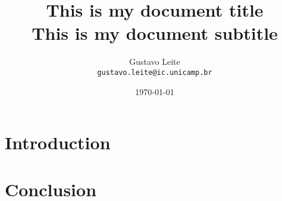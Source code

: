 \documentclass[12pt,a4paper]{article}
\title{This is my document title \\ \large This is my document subtitle}
\author{Gustavo Leite \\ \texttt{gustavo.leite@ic.unicamp.br}}
\date{\today}
\begin{document}
\maketitle

\begin{abstract}
  \lipsum[1]
\end{abstract}

\section{Introduction} \label{sec:intro}

\lipsum[4-6]

\section{Conclusion} \label{sec:conclusion}

\lipsum[1-2]

\newpage
\singlespacing

\nocite{*} %


\end{document}
